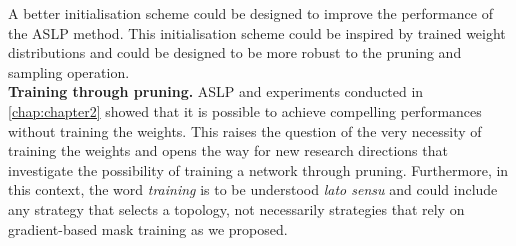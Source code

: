 A better initialisation scheme could be designed to improve the performance of
the \ac{ASLP} method. This initialisation scheme could be inspired by trained
weight distributions and could be designed to be more robust to the pruning and
sampling operation.\\

\noindent \textbf{Training through pruning.} \ac{ASLP} and experiments conducted
in \cref{chap:chapter2} showed that it is possible to achieve compelling
performances without training the weights. This raises the question of the very
necessity of training the weights and opens the way for new research directions
that investigate the possibility of training a network through pruning.
Furthermore, in this context, the word \emph{training} is to be understood
\emph{lato sensu} and could include any strategy that selects a topology, not
necessarily strategies that rely on gradient-based mask training as we proposed.